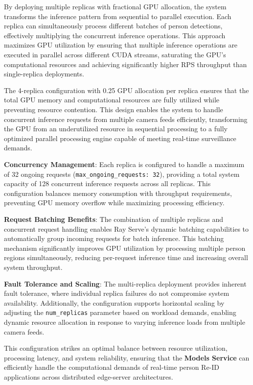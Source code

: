 By deploying multiple replicas with fractional GPU allocation, the system transforms the inference pattern from sequential to parallel execution. Each replica can simultaneously process different batches of person detections, effectively multiplying the concurrent inference operations. This approach maximizes GPU utilization by ensuring that multiple inference operations are executed in parallel across different CUDA streams, saturating the GPU's computational resources and achieving significantly higher RPS throughput than single-replica deployments.

The 4-replica configuration with 0.25 GPU allocation per replica ensures that the total GPU memory and computational resources are fully utilized while preventing resource contention. This design enables the system to handle concurrent inference requests from multiple camera feeds efficiently, transforming the GPU from an underutilized resource in sequential processing to a fully optimized parallel processing engine capable of meeting real-time surveillance demands.

\textbf{Concurrency Management}: Each replica is configured to handle a maximum of 32 ongoing requests (\texttt{max\_ongoing\_requests: 32}), providing a total system capacity of 128 concurrent inference requests across all replicas. This configuration balances memory consumption with throughput requirements, preventing GPU memory overflow while maximizing processing efficiency.

\textbf{Request Batching Benefits}: The combination of multiple replicas and concurrent request handling enables Ray Serve's dynamic batching capabilities to automatically group incoming requests for batch inference. This batching mechanism significantly improves GPU utilization by processing multiple person regions simultaneously, reducing per-request inference time and increasing overall system throughput.

\textbf{Fault Tolerance and Scaling}: The multi-replica deployment provides inherent fault tolerance, where individual replica failures do not compromise system availability. Additionally, the configuration supports horizontal scaling by adjusting the \texttt{num\_replicas} parameter based on workload demands, enabling dynamic resource allocation in response to varying inference loads from multiple camera feeds.

This configuration strikes an optimal balance between resource utilization, processing latency, and system reliability, ensuring that the \textbf{Models Service} can efficiently handle the computational demands of real-time person Re-ID applications across distributed edge-server architectures.

